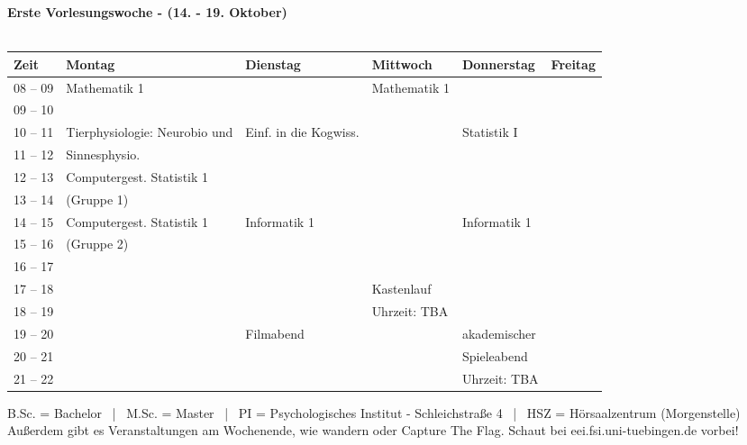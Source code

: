 \textbf{Erste Vorlesungswoche - (14. - 19. Oktober)}\\
\\
\begin{tabular}{|l|p{}|p{}|p{}|p{}|p{}|} \hline
	Zeit & Montag & Dienstag & Mittwoch & Donnerstag & Freitag \\ 
	\hline \hline
 08 -- 09 & \footnotesize{Mathematik 1} & & \footnotesize{Mathematik 1} & & \\ \cline{1-1}
 09 -- 10 & & & & & \\ \cline{1-5}
 10 -- 11 & \footnotesize{Tierphysiologie: Neurobio und} & \footnotesize{Einf. in die Kogwiss.} & & \footnotesize{Statistik I} & \\ \cline{1-1} 
 11 -- 12 & \footnotesize{Sinnesphysio.} &  & &  & \\ \cline{1-3} \cline{5-5}
 12 -- 13 & \footnotesize{Computergest. Statistik 1}& & & & \\ \cline{1-1}
 13 -- 14 & \footnotesize{(Gruppe 1)}& & & & \\ \cline{1-3} \cline{5-5}
 14 -- 15 & \footnotesize{Computergest. Statistik 1} & \footnotesize{Informatik 1} & & \footnotesize{Informatik 1} & \\  \cline {1-1}
 15 -- 16 & \footnotesize{(Gruppe 2)} &  & & & \\ \cline{1-3} \cline{5-5}
 16 -- 17 & & & & & \\ \cline{1-1}
 17 -- 18 & & & \cellcolor{lightlightgray} \footnotesize{Kastenlauf }& & \\ \cline{1-1}
 18 -- 19 & & &\cellcolor{lightlightgray} \footnotesize{Uhrzeit: TBA} & & \\ \cline{1-1}
 19 -- 20 & & \cellcolor{lightlightgray} \footnotesize{Filmabend}  & \cellcolor{lightlightgray} & \footnotesize{akademischer} \cellcolor{lightlightgray}& \\ \cline{1-1}
 20 -- 21 & &  \cellcolor{lightlightgray} &\cellcolor{lightlightgray} & \cellcolor{lightlightgray} \footnotesize{Spieleabend} & \\ \cline{1-1}
 21 -- 22 & &  \cellcolor{lightlightgray} & \cellcolor{lightlightgray} &  \cellcolor{lightlightgray} \footnotesize{Uhrzeit: TBA} & \\ \hline
\end{tabular}

\scriptsize{B.Sc. = Bachelor ~|~ M.Sc. = Master ~|~ PI = Psychologisches Institut - Schleichstraße 4 ~|~ HSZ = Hörsaalzentrum (Morgenstelle)}
\scriptsize{Außerdem gibt es Veranstaltungen am Wochenende, wie wandern oder Capture The Flag. Schaut bei eei.fsi.uni-tuebingen.de vorbei!}

